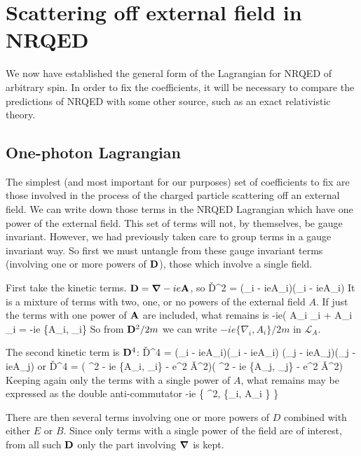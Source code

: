 \section{Scattering off external field in NRQED}
We now have established the general form of the Lagrangian for NRQED of arbitrary spin.  In order to fix the coefficients, it will be necessary to compare the predictions of NRQED with some other source, such as an exact relativistic theory.


\subsection{One-photon Lagrangian}
The simplest (and most important for our purposes) set of coefficients to fix are those involved in the process of the charged particle scattering off an external field.  We can write down those terms in the NRQED Lagrangian which have one power of the external field.  This set of terms will not, by themselves, be gauge invariant.  However, we had previously taken care to group terms in a gauge invariant way.  So first we must untangle from these gauge invariant terms (involving one or more powers of $\mathbf{D}$), those which involve a single field.


First take the kinetic terms.  $\mathbf{D} = \mbox{\boldmath$ \nabla $} - ie\mathbf{A}$, so
\beq
	\v{D}^2 = (\nabla_i - ieA_i)(\nabla_i - ieA_i)
\eeq
It is a mixture of terms with two, one, or no powers of the external field $A$.  If just the terms with one power of $\mathbf{A}$ are included, what remains is
\beq
	-ie( A_i \nabla_i + A_i \nabla_i = -ie \{A_i, \nabla_i\}
\eeq
So from $\mathbf{D}^2/ 2m$ we can write $-ie \{\nabla_i, A_i\}/2m$ in  $\mathcal{L}_A$.

The second kinetic term is $\mathbf{D}^4$:
\beq
	\v{D}^4 = (\nabla_i - ieA_i)(\nabla_i - ieA_i) (\nabla_j - ieA_j)(\nabla_j - ieA_j)
\eeq
or
\beq
	\v{D}^4 = ( \grad^2 - ie \{A_i, \nabla_i\} - e^2 \v{A}^2)( \grad^2 - ie \{A_j, \nabla_j\} - e^2 \v{A}^2)
\eeq
Keeping again only the terms with a single power of $A$, what remains may be expressed as the double anti-commutator
\beq
	-ie \{ \grad^2, \{\nabla_i, A_i \} \} 
\eeq

There are then several terms involving one or more powers of $D$ combined with either $E$ or $B$.  Since only terms with a single power of the field are of interest, from all such $\mathbf{D}$ only the part involving $\grad$ is kept.



